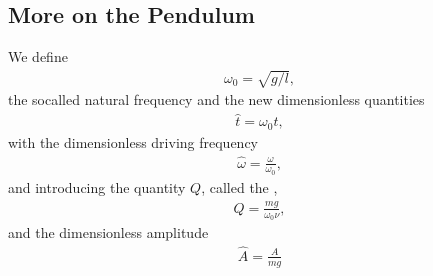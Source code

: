 \documentclass[letterpaper,10pt,english]{sphinxmanual}
\begin{document}
\subsection{More on the Pendulum}
\label{\detokenize{chapter2:id4}}
We define
\begin{equation*}
\begin{split}
\omega_0=\sqrt{g/l},
\end{split}
\end{equation*}
the so\sphinxhyphen{}called natural frequency and the new dimensionless quantities
\begin{equation*}
\begin{split}
\hat{t}=\omega_0t,
\end{split}
\end{equation*}
with the dimensionless driving frequency
\begin{equation*}
\begin{split}
\hat{\omega}=\frac{\omega}{\omega_0},
\end{split}
\end{equation*}
and introducing the quantity \(Q\), called the ,
\begin{equation*}
\begin{split}
Q=\frac{mg}{\omega_0\nu},
\end{split}
\end{equation*}
and the dimensionless amplitude
\begin{equation*}
\begin{split}
\hat{A}=\frac{A}{mg}
\end{split}
\end{equation*}
\end{document}
